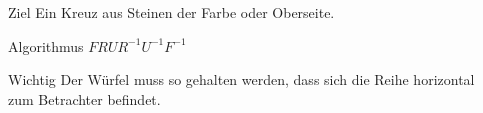 \begin{frame}
\begin{columns}[c]
\begin{column}[C]{.5\textwidth}
		\end{column}
		\begin{column}[C]{.5\textwidth}
			\begin{block}{Ziel}
				Ein Kreuz aus Steinen der Farbe oder Oberseite.
			\end{block}
			\begin{exampleblock}{Algorithmus}
				$FRUR^{-1}U^{-1}F^{-1}$
			\end{exampleblock}
			\begin{alertblock}{Wichtig}
				Der Würfel muss so gehalten werden, dass sich die Reihe horizontal zum Betrachter befindet.
			\end{alertblock}
		\end{column}
	\end{columns}
	
\end{frame}

